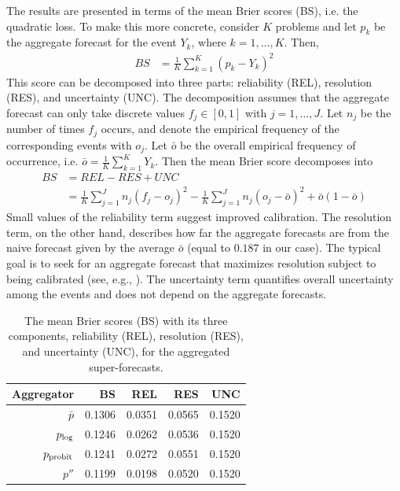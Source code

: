 \documentclass[11pt]{article}
\theoremstyle{definition}
\theoremstyle{definition}
\def\probit{p_{\rm probit}}
\def\plog{p_{\rm log}}
\begin{document}
 
The results are presented in terms of the mean Brier scores (BS),
i.e. the quadratic loss. To make this more concrete, consider $K$
problems and let $p_k$ be the aggregate forecast for the event $Y_k$,
where $k = 1, \dots, K$. Then,
 \begin{align*}
BS &= \frac{1}{K} \sum_{k=1}^K (p_k - Y_k)^2
 \end{align*}
 This score can be decomposed into three parts: reliability (REL),
resolution (RES), and uncertainty (UNC). The decomposition assumes
that the aggregate forecast can only take discrete values $f_j \in
[0,1]$ with $j = 1, \dots, J$. Let $n_j$ be the number of times $f_j$
occurs, and denote the empirical frequency of the corresponding events
with $o_j$.  Let $\bar{o}$ be the overall empirical frequency of
occurrence, i.e. $\bar{o} = \frac{1}{K} \sum_{k=1}^K Y_k$. Then the
mean Brier score decomposes into
 \begin{align*}
BS &= REL - RES + UNC\\
&= \frac{1}{K} \sum_{j=1}^J n_j (f_j - o_j)^2 - \frac{1}{K} \sum_{j=1}^J n_j (o_j - \bar{o})^2 + \bar{o}(1-\bar{o})
 \end{align*}
 Small values of the reliability term suggest improved
calibration. The resolution term, on the other hand, describes how far
the aggregate forecasts are from the naive forecast given by the
average $\bar{o}$ (equal to $0.187$ in our case). The typical goal is
to seek for an aggregate forecast that maximizes resolution subject to
being calibrated (see, e.g., \citealt{gneiting2007probabilistic}). The
uncertainty term quantifies overall uncertainty among the events and
does not depend on the aggregate forecasts.
 
\begin{table}[t]
\centering
\begin{tabular}{rrrrr}
  \hline
Aggregator & BS & REL & RES & UNC \\ 
  \hline
$\bar{p}$ & 0.1306 & 0.0351 & 0.0565 & 0.1520 \\ 
 $\plog$ & 0.1246 & 0.0262 & 0.0536 & 0.1520 \\ 
 $\probit$ & 0.1241 & 0.0272 & 0.0551 & 0.1520 \\ 
 $p''$ & 0.1199 & 0.0198 & 0.0520 & 0.1520 \\ 
   \hline
\end{tabular}
\caption{The mean Brier scores (BS) with its three components, reliability (REL), resolution (RES), and uncertainty (UNC), for the aggregated super-forecasts.}
\label{BrierTable}
\end{table}
\end{document}
